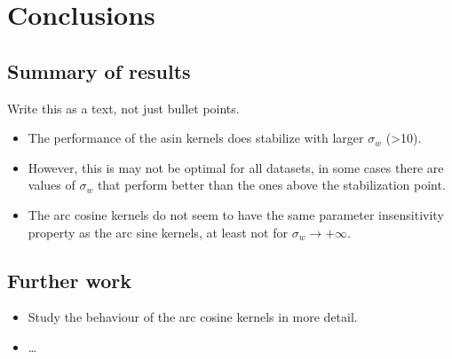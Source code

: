 \chapter{Conclusions}
\label{sec:conclusions}

\section{Summary of results}

\begin{marker}
    Write this as a text, not just bullet points.
\end{marker}

\begin{itemize}
    \item The performance of the asin kernels does stabilize with larger
          $\sigma_w$ (>10).
    \item However, this is may not be optimal for all datasets, in some cases
          there are values of $\sigma_w$ that perform better than the ones
          above the stabilization point.
    \item The arc cosine kernels do not seem to have the same parameter
          insensitivity property as the arc sine kernels, at least not for
          $\sigma_w \to +\infty$.
\end{itemize}

\section{Further work}

\begin{itemize}
    \item Study the behaviour of the arc cosine kernels in more detail.
    \item \dots
\end{itemize}

